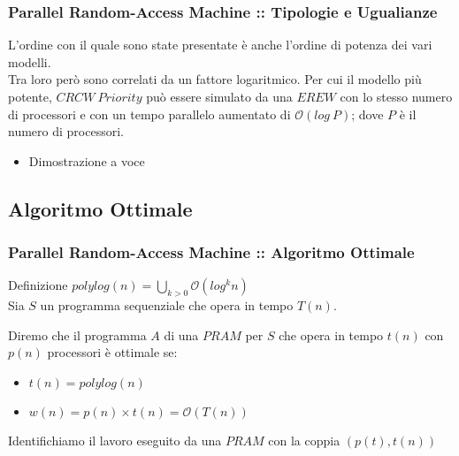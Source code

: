 \documentclass{beamer}
\newcommand{\bigO}{\ensuremath{\mathcal{O}}} %
\begin{document}
\begin{frame}
	\frametitle{Parallel Random-Access Machine :: Tipologie e Ugualianze} %
	L'ordine con il quale sono state presentate è anche l'ordine di potenza dei vari modelli.\\
	Tra loro però sono correlati da un fattore logaritmico. Per cui il modello più potente, $CRCW\ Priority$ può essere simulato da una $EREW$ con lo stesso numero di processori e con un tempo parallelo aumentato di $\bigO{(log\ P)}$; dove $P$ è il numero di processori.
	\begin{itemize}
		\item Dimostrazione a voce
	\end{itemize}
\end{frame}

\subsection{Algoritmo Ottimale}

\begin{frame}
	\frametitle{Parallel Random-Access Machine :: Algoritmo Ottimale} %
	
	\begin{block}{Definizione}
		$polylog(n) = \bigcup_{k>0}\bigO{(log^k n)}$\\
		Sia $S$ un programma sequenziale che opera in tempo $T(n)$.\\
	\end{block}
	Diremo che il programma $A$ di una $PRAM$ per $S$ che opera in tempo $t(n)$ con $p(n)$ processori è ottimale se:
	\begin{itemize}
		\item $t(n) = polylog(n)$
		\item $w(n) = p(n)\times t(n) = \bigO{(T(n))}$
	\end{itemize}
	Identifichiamo il lavoro eseguito da una $PRAM$ con la coppia $(p(t),t(n))$
\end{frame}
\end{document}
